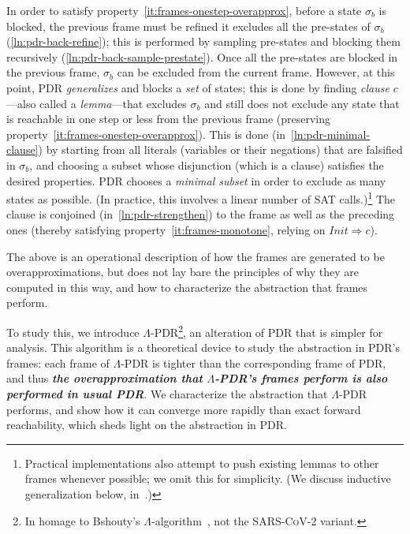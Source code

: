 \documentclass[acmsmall,screen]{acmart}
\renewcommand{\implies}{\Longrightarrow}
\newcommand{\Init}{{\textit{Init}}}
\begin{document}
In order to satisfy property~\ref{it:frames-onestep-overapprox}, before a state $\sigma_b$ is blocked, the previous frame must be refined it excludes all the pre-states of $\sigma_b$ (\cref{ln:pdr-back-refine}); this is performed by sampling pre-states and blocking them recursively (\cref{ln:pdr-back-sample-prestate}).
Once all the pre-states are blocked in the previous frame, $\sigma_b$ can be excluded from the current frame.
%
%
%
%
However, at this point, %
PDR \emph{generalizes} and blocks a \emph{set} of states; this is done by finding \emph{clause} $c$---also called a \emph{lemma}---that excludes $\sigma_b$ and still does not exclude any state that is reachable in one step or less from the previous frame (preserving property~\ref{it:frames-onestep-overapprox}).
This is done (in~\cref{ln:pdr-minimal-clause}) by starting from all literals (variables or their negations) that are falsified in $\sigma_b$, and choosing a subset whose disjunction (which is a clause) satisfies the desired properties. PDR chooses a \emph{minimal subset} in order to exclude as many states as possible. (In practice, this involves a linear number of SAT calls.)\footnote{
	Practical implementations also attempt to push existing lemmas to other frames whenever possible; we omit this for simplicity. (We discuss inductive generalization below, in~.)
}
The clause is conjoined (in~\cref{ln:pdr-strengthen}) to the frame as well as the preceding ones (thereby satisfying property~\ref{it:frames-monotone}, relying on $\Init \implies c$).

The above is an operational description of how the frames are generated to be overapproximations, but does not lay bare the principles of why they are computed in this way, and how to characterize the abstraction that frames perform.

To study this, we introduce $\Lambda$-PDR\footnote{In homage to Bshouty's $\Lambda$-algorithm~\cite{DBLP:journals/iandc/Bshouty95}, not the \textsc{SARS-CoV-2} variant.}, an alteration of PDR that is simpler for analysis.
%
This algorithm is a theoretical device to study the abstraction in PDR's frames: each frame of $\Lambda$-PDR is tighter than the corresponding frame of PDR, and thus \textbf{\textit{the overapproximation that $\Lambda$-PDR's frames perform is also performed in usual PDR}}.
We characterize the abstraction that $\Lambda$-PDR performs, and show how it can converge more rapidly than exact forward reachability, which sheds light on the abstraction in PDR.
%
%
%
%
%
\end{document}
